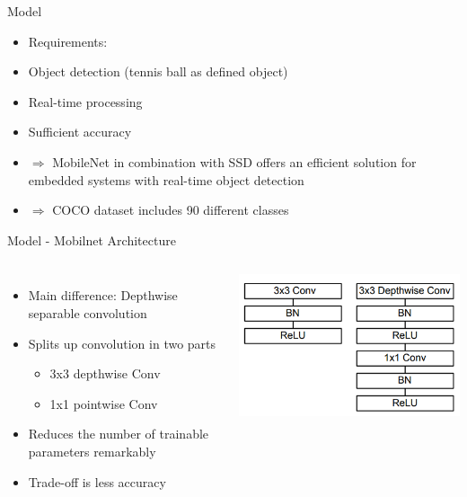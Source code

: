 \documentclass{beamer}
\begin{document}
\begin{frame}{Model}
\begin{itemize}
\item[] Requirements:
\item Object detection (tennis ball as defined object)
\item Real-time processing
\item Sufficient accuracy
\end{itemize}
\vspace{1cm}
\begin{itemize}
\item[]$\Rightarrow$ MobileNet in combination with SSD offers an efficient solution for embedded systems with real-time object detection
\item[]$\Rightarrow$ COCO dataset includes 90 different classes
\end{itemize}
\end{frame}

\begin{frame}{Model - Mobilnet Architecture}
\begin{columns}
\begin{itemize}
\item Main difference: Depthwise separable convolution
\item Splits up convolution in two parts
	\begin{itemize}
	\item 3x3 depthwise Conv
	\item 1x1 pointwise Conv
	\end{itemize}
\item Reduces the number of trainable parameters remarkably
\item Trade-off is less accuracy
\end{itemize}
\includegraphics[scale=0.3]{sources/mobilenet_depthwise.png}
\end{columns}
\end{frame}
\end{document}
